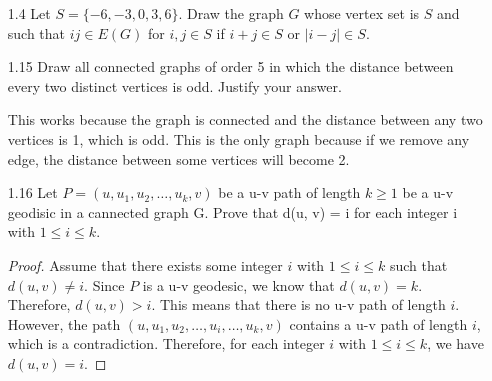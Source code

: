 \documentclass[12pt]{article}
\begin{document}
\begin{enumerate}
\item[1.4] Let $S = \{-6, -3, 0, 3, 6\}$. Draw the graph $G$ whose vertex set is $S$ and such that $ij \in E(G)$ for $i, j \in S$ if $i + j \in S$ or $|i - j| \in S$.

\begin{center}
\end{center}
    
 \item[1.15] Draw all connected graphs of order 5 in which the distance between every two distinct vertices is odd.  Justify your answer.
    \begin{center}
\end{center}
\noindent
This works because the graph is connected and the distance between any two vertices is 1, which is odd.  This is the only graph because if we remove any edge, the distance between some vertices will become 2.

\item[1.16] Let $P = (u, u_1, u_2, \ldots, u_k, v)$ be a u-v path of length $k \ge 1$ be a u-v geodisic in a cannected graph G. Prove that d(u, v) = i for each integer i with $1 \le i \le k$. 
 \begin{proof}
Assume that there exists some integer $i$ with $1 \le i \le k$ such that $d(u, v) \ne i$.  Since $P$ is a u-v geodesic, we know that $d(u, v) = k$. 
 Therefore, $d(u, v) > i$.  This means that there is no u-v path of length $i$.  However, the path $(u, u_1, u_2, \ldots, u_i, \ldots, u_k, v)$ contains a u-v path of length $i$, 
 which is a contradiction.  Therefore, for each integer $i$ with $1 \le i \le k$, we have $d(u, v) = i$.
\end{proof}


\end{enumerate}
\end{document}
